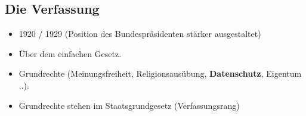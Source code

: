 \documentclass[12pt]{article}
\begin{document}
    \begin{center}
        \section{Die Verfassung}
    \end{center}
    \begin{itemize}
        \item 1920 / 1929 (Position des Bundespräsidenten stärker ausgestaltet)
        \item Über dem einfachen Gesetz.
        \item Grundrechte (Meinungsfreiheit, Religionsausübung, \textbf{Datenschutz}, Eigentum ..).
        \item Grundrechte stehen im Staatsgrundgesetz (Verfassungsrang)
    \end{itemize}
\end{document}
